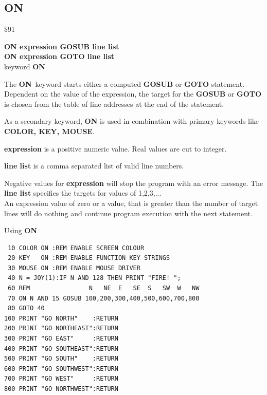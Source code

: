 \subsection{ON}
\begin{description}[leftmargin=2cm,style=nextline]
\item [Token:] \$91
\item [Format:] {\bf ON expression GOSUB line list} \\
                {\bf ON expression GOTO line list}  \\
                 keyword {\bf ON}
\item [Usage:]  The {\bf ON} keyword starts
                either a computed {\bf GOSUB} or {\bf GOTO} statement.
                Dependent on the value of the expression, the target
                for the {\bf GOSUB} or {\bf GOTO} is chosen from
                the table of line addresses at the end of the statement.

                As a secondary keyword, {\bf ON} is used in
                combination with primary keywords like
                {\bf COLOR, KEY, MOUSE}.

                {\bf expression} is a positive numeric value.
                Real values are cut to integer.

                {\bf line list} is a comma separated list of valid
                line numbers.

\item [Remarks:] Negative values for {\bf expression} will stop
                 the program with an error message.
                 The {\bf line list} specifies the targets for values
                 of 1,2,3,... \\
                 An expression value of zero or a value, that is greater
                 than the number of target lines will do nothing and
                 continue program execution with the next statement.

\newpage
\item [Example:] Using {\bf ON}
\begin{tcolorbox}[colback=black,coltext=white]
\verbatimfont{\codefont}
\begin{verbatim}
 10 COLOR ON :REM ENABLE SCREEN COLOUR
 20 KEY   ON :REM ENABLE FUNCTION KEY STRINGS
 30 MOUSE ON :REM ENABLE MOUSE DRIVER
 40 N = JOY(1):IF N AND 128 THEN PRINT "FIRE! ";
 60 REM                N   NE  E   SE  S   SW  W   NW
 70 ON N AND 15 GOSUB 100,200,300,400,500,600,700,800
 80 GOTO 40
100 PRINT "GO NORTH"    :RETURN
200 PRINT "GO NORTHEAST":RETURN
300 PRINT "GO EAST"     :RETURN
400 PRINT "GO SOUTHEAST":RETURN
500 PRINT "GO SOUTH"    :RETURN
600 PRINT "GO SOUTHWEST":RETURN
700 PRINT "GO WEST"     :RETURN
800 PRINT "GO NORTHWEST":RETURN
\end{verbatim}
\end{tcolorbox}
\end{description}

